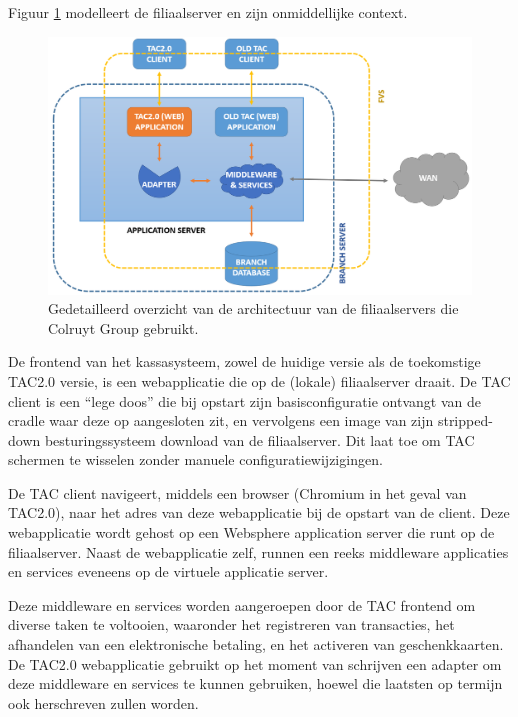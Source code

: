Figuur \ref{fig:FVSDetail} modelleert de filiaalserver en zijn onmiddellijke context.

\begin{figure}[h!]
    \centering
    \includegraphics[scale=0.35]{img/func-omsch/DiagramLowerLevel.PNG}
    \caption{Gedetailleerd overzicht van de architectuur van de filiaalservers die Colruyt Group gebruikt.}
    \label{fig:FVSDetail}
\end{figure}

De frontend van het kassasysteem, zowel de huidige versie als de toekomstige TAC2.0 versie, is een webapplicatie die op de (lokale) filiaalserver draait. De TAC client is een ``lege doos'' die bij opstart zijn basisconfiguratie ontvangt van de cradle waar deze op aangesloten zit, en vervolgens een image van zijn stripped-down besturingssysteem download van de filiaalserver. Dit laat toe om TAC schermen te wisselen zonder manuele configuratiewijzigingen.

De TAC client navigeert, middels een browser (Chromium in het geval van TAC2.0), naar het adres van deze webapplicatie bij de opstart van de client. Deze webapplicatie wordt gehost op een Websphere application server die runt op de filiaalserver. Naast de webapplicatie zelf, runnen een reeks middleware applicaties en services eveneens op de virtuele applicatie server.

Deze middleware en services worden aangeroepen door de TAC frontend om diverse taken te voltooien, waaronder het registreren van transacties, het afhandelen van een elektronische betaling, en het activeren van geschenkkaarten. De TAC2.0 webapplicatie gebruikt op het moment van schrijven een adapter om deze middleware en services te kunnen gebruiken, hoewel die laatsten op termijn ook herschreven zullen worden.

